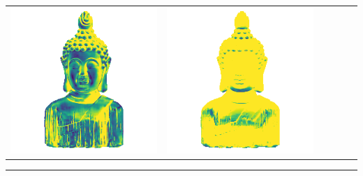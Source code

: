 \begin{center}
\begin{tabularx}{\linewidth}{@{}Y@{}Y@{}Y@{}Y@{}Y@{}Y@{}}
\includegraphics[width=\linewidth]{semisynthetic/20160617_16_marrnet_err.png} &
\includegraphics[width=\linewidth]{semisynthetic/20160617_16_ef_err.png} \\
\end{tabularx}
\begin{center}\rule{0.5\linewidth}{\linethickness}\end{center}


\end{center}
